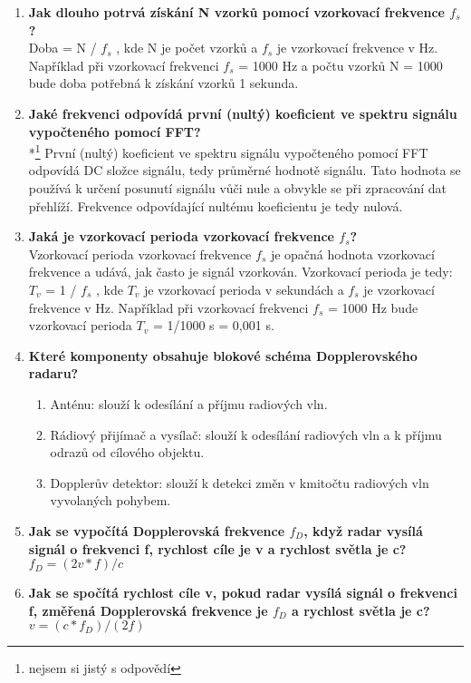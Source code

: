 \documentclass{article}
\begin{document}
\begin{enumerate}
        \item \textbf{Jak dlouho potrvá získání N vzorků pomocí vzorkovací frekvence $f_s$?} \\[0.6em] { Doba = N / $f_s$ , kde N je počet vzorků a $f_s$ je vzorkovací frekvence v Hz. Například při vzorkovací frekvenci $f_s$ = 1000 Hz a počtu vzorků N = 1000 bude doba potřebná k získání vzorků 1 sekunda.}
        \item \textbf{Jaké frekvenci odpovídá první (nultý) koeficient ve spektru signálu vypočteného pomocí FFT?} \\[0.6em] {*\footnote[6]{nejsem si jistý s odpovědí} První (nultý) koeficient ve spektru signálu vypočteného pomocí FFT odpovídá DC složce signálu, tedy průměrné hodnotě signálu. Tato hodnota se používá k určení posunutí signálu vůči nule a obvykle se při zpracování dat přehlíží. Frekvence odpovídající nultému koeficientu je tedy nulová.}
        \item \textbf{Jaká je vzorkovací perioda vzorkovací frekvence $f_s$?} \\[0.6em] {Vzorkovací perioda vzorkovací frekvence $f_s$ je opačná hodnota vzorkovací frekvence a udává, jak často je signál vzorkován. Vzorkovací perioda je tedy: $T_v$ = 1 / $f_s$ , kde $T_v$ je vzorkovací perioda v sekundách a $f_s$ je vzorkovací frekvence v Hz. Například při vzorkovací frekvenci $f_s$ = 1000 Hz bude vzorkovací perioda $T_v$ = 1/1000 s = 0,001 s.}
        \item \textbf{Které komponenty obsahuje blokové schéma Dopplerovského radaru?} \\ [-1.5em]
        \begin{enumerate}
            \item {Anténu: slouží k odesílání a příjmu radiových vln.}
            \item {Rádiový přijímač a vysílač: slouží k odesílání radiových vln a k příjmu odrazů od cílového objektu.}
            \item {Dopplerův detektor: slouží k detekci změn v kmitočtu radiových vln vyvolaných pohybem.}
        \end{enumerate}
        \item \textbf{Jak se vypočítá Dopplerovská frekvence $f_D$, když radar vysílá signál o frekvenci f, rychlost cíle je v a rychlost světla je c?} \\[0.6em] ${ f_D = (2v*f)/c}$
        \item \textbf{Jak se spočítá rychlost cíle v, pokud radar vysílá signál o frekvenci f, změřená Dopplerovská frekvence je $f_D$ a rychlost světla je c?} \\[0.6em] ${ v = (c*f_D)/(2f)}$

\end{enumerate}
\end{document}
